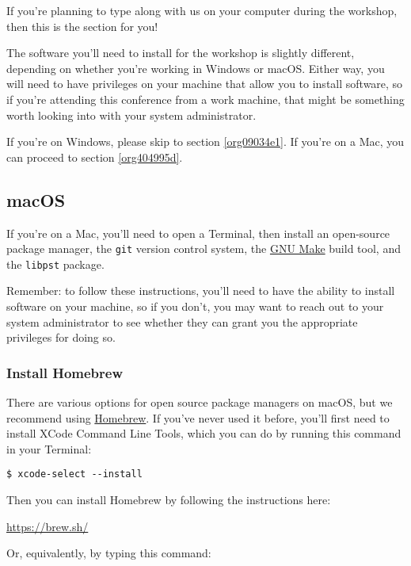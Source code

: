 \documentclass[11pt]{article}
\begin{document}
If you're planning to type along with us on your computer during the
workshop, then this is the section for you!

The software you'll need to install for the workshop is slightly
different, depending on whether you're working in Windows or macOS.
Either way, you will need to have privileges on your machine that
allow you to install software, so if you're attending this conference
from a work machine, that might be something worth looking into with
your system administrator.

If you're on Windows, please skip to section \ref{org09034e1}.  If you're on a
Mac, you can proceed to section \ref{org404995d}.

\subsection{macOS \label{org404995d}}
\label{sec:org46d2026}

If you're on a Mac, you'll need to open a Terminal, then install an
open-source package manager, the \texttt{git} version control system, the \href{https://www.gnu.org/software/make/}{GNU
Make} build tool, and the \texttt{libpst} package.  

Remember: to follow these instructions, you'll need to have the
ability to install software on your machine, so if you don't, you may
want to reach out to your system administrator to see whether they can
grant you the appropriate privileges for doing so.

\subsubsection{Install Homebrew}
\label{sec:orgf329609}

There are various options for open source package managers on macOS,
but we recommend using \href{https://brew.sh}{Homebrew}.  If you've never used it
before, you'll first need to install XCode Command Line Tools, which
you can do by running this command in your Terminal:

\begin{verbatim}
$ xcode-select --install
\end{verbatim}

Then you can install Homebrew by following the instructions here:

\url{https://brew.sh/}

Or, equivalently, by typing this command:

\footnotesize
\end{document}
